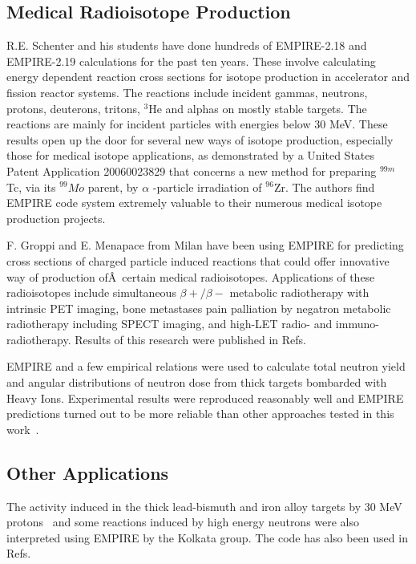 \subsection{Medical Radioisotope Production}

R.E. Schenter and his students have done hundreds of EMPIRE-2.18 and
EMPIRE-2.19 calculations for the past ten years. These involve calculating
energy dependent reaction cross sections for isotope production in
accelerator and fission reactor systems. The reactions include incident
gammas, neutrons, protons, deuterons, tritons, $^{3}$He and alphas on mostly
stable targets. The reactions are mainly for incident particles with
energies below 30 MeV. These results open up the door for several new ways
of isotope production, especially those for medical isotope applications, as
demonstrated by a United States Patent Application 20060023829 that concerns
a new method for preparing $^{99m}$Tc, via its $^{99}Mo$ parent, by $\alpha $%
-particle irradiation of $^{96}$Zr. The authors find EMPIRE code system
extremely valuable to their numerous medical isotope production projects.

F. Groppi and E. Menapace from Milan have been using EMPIRE for predicting
cross sections of charged particle induced reactions that could offer
innovative way of production of\^{A}~certain medical radioisotopes.
Applications of these radioisotopes include simultaneous $\beta+/\beta-$
metabolic radiotherapy with intrinsic PET imaging, bone metastases pain
palliation by negatron metabolic radiotherapy including SPECT imaging, and
high-LET radio- and immuno-radiotherapy. Results of this research were
published in Refs.~\cite{Menapace:04, Menapace:05, Groppi:05, Groppi:05a,
Groppi:06, Alfassi:06, Persico:06}

EMPIRE and a few empirical relations were used to calculate total neutron
yield and angular distributions of neutron dose from thick targets bombarded
with Heavy Ions. Experimental results were reproduced reasonably well and
EMPIRE predictions turned out to be more reliable than other approaches
tested in this work~\cite{Nandy:07}.

\subsection{Other Applications}

The activity induced in the thick lead-bismuth and iron alloy targets by 30
MeV protons~\cite{Nandy:07a} and some reactions induced by high energy
neutrons were also interpreted using EMPIRE by the Kolkata group. The code
has also been used in Refs.~\cite{Said:06, Elmaghraby:06, Pandey:07}

